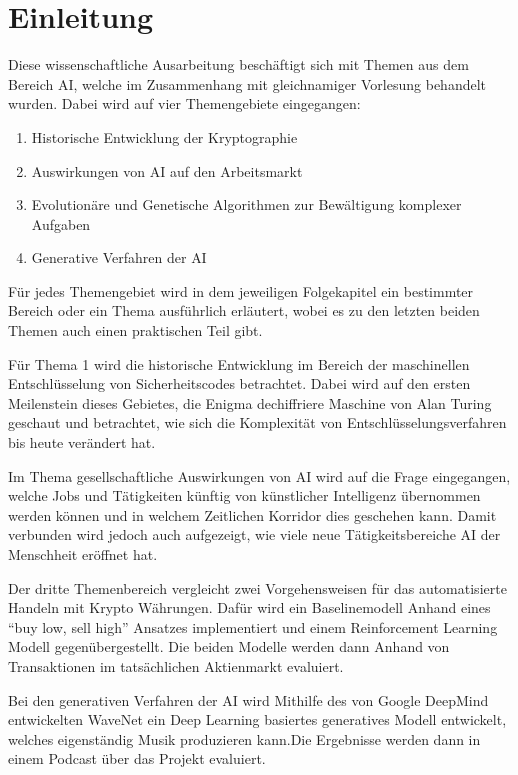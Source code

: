 \chapter{Einleitung}

\nocite{*}

Diese wissenschaftliche Ausarbeitung beschäftigt sich mit Themen aus dem Bereich \ac{AI}, welche im Zusammenhang mit gleichnamiger Vorlesung behandelt wurden. Dabei wird auf vier Themengebiete eingegangen:

\begin{enumerate}
	\item Historische Entwicklung der Kryptographie
	\item Auswirkungen von \ac{AI} auf den Arbeitsmarkt
	\item Evolutionäre und Genetische Algorithmen zur Bewältigung komplexer Aufgaben
	\item Generative Verfahren der \ac{AI}
\end{enumerate}

Für jedes Themengebiet wird in dem jeweiligen Folgekapitel ein bestimmter Bereich oder ein Thema ausführlich erläutert, wobei es zu den letzten beiden Themen auch einen praktischen Teil gibt.

Für Thema 1 wird die historische Entwicklung im Bereich der maschinellen Entschlüsselung von Sicherheitscodes betrachtet. Dabei wird auf den ersten Meilenstein dieses Gebietes, die Enigma dechiffriere Maschine von Alan Turing geschaut und betrachtet, wie sich die Komplexität von Entschlüsselungsverfahren bis heute verändert hat.

Im Thema gesellschaftliche Auswirkungen von \ac{AI} wird auf die Frage eingegangen, welche Jobs und Tätigkeiten künftig von künstlicher Intelligenz übernommen werden können und in welchem Zeitlichen Korridor dies geschehen kann. Damit verbunden wird jedoch auch aufgezeigt, wie viele neue Tätigkeitsbereiche \ac{AI} der Menschheit eröffnet hat.

Der dritte Themenbereich vergleicht zwei Vorgehensweisen für das automatisierte Handeln mit Krypto Währungen. Dafür wird ein Baselinemodell Anhand eines \enquote{buy low, sell high} Ansatzes implementiert und einem Reinforcement Learning Modell gegenübergestellt. Die beiden Modelle werden dann Anhand von Transaktionen im tatsächlichen Aktienmarkt evaluiert.

Bei den generativen Verfahren der \ac{AI} wird Mithilfe des von Google DeepMind entwickelten WaveNet ein Deep Learning basiertes generatives Modell entwickelt, welches eigenständig Musik produzieren kann.Die Ergebnisse werden dann in einem Podcast über das Projekt evaluiert.

